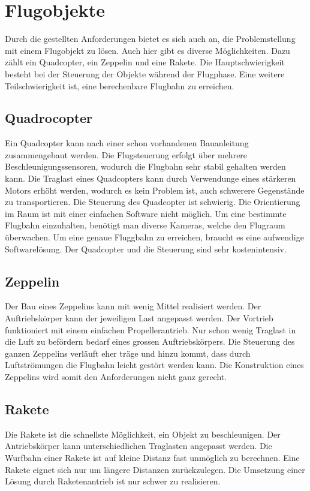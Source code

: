 \section{Flugobjekte}
Durch die gestellten Anforderungen bietet es sich auch an, die Problemstellung mit einem Flugobjekt zu lösen. Auch hier gibt es diverse Möglichkeiten. Dazu zählt ein Quadcopter, ein Zeppelin und eine Rakete. Die Hauptschwierigkeit besteht bei der Steuerung der Objekte während der Flugphase. Eine weitere Teilschwierigkeit ist, eine berechenbare Flugbahn zu erreichen. 

\subsection{Quadrocopter}
Ein Quadcopter kann nach einer schon vorhandenen Bauanleitung zusammengebaut werden. Die Flugsteuerung erfolgt über mehrere Beschleunigungssensoren, wodurch die Flugbahn sehr stabil gehalten werden kann. Die Traglast eines Quadcopters kann durch Verwendunge eines stärkeren Motors erhöht werden, wodurch es kein Problem ist, auch schwerere Gegenstände zu transportieren. Die Steuerung des Quadcopter ist schwierig. Die Orientierung im Raum ist mit einer einfachen Software nicht möglich. Um eine bestimmte Flugbahn einzuhalten, benötigt man diverse Kameras, welche den Flugraum überwachen. Um eine genaue Fluggbahn zu erreichen, braucht es eine aufwendige Softwarelösung. Der Quadcopter und die Steuerung sind sehr kostenintensiv.

\subsection{Zeppelin}
Der Bau eines Zeppelins kann mit wenig Mittel realisiert werden. Der Auftriebskörper kann der jeweiligen Last angepasst werden. Der Vortrieb funktioniert mit einem einfachen Propellerantrieb. Nur schon wenig Traglast in die Luft zu befördern bedarf eines grossen Auftriebskörpers. Die Steuerung des ganzen Zeppelins verläuft eher träge und hinzu kommt, dass durch Luftströmungen die Flugbahn leicht gestört werden kann. Die Konstruktion eines Zeppelins wird somit den Anforderungen nicht ganz gerecht.

\subsection{Rakete}
Die Rakete ist die schnellste Möglichkeit, ein Objekt zu beschleunigen. Der Antriebskörper kann unterschiedlichen Traglasten angepasst werden. Die Wurfbahn einer Rakete ist auf kleine Distanz fast unmöglich zu berechnen. Eine Rakete eignet sich nur um längere Distanzen zurückzulegen. Die Umsetzung einer Lösung durch Raketenantrieb ist nur schwer zu realisieren.
